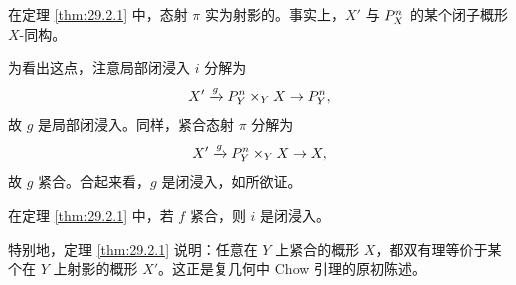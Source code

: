 \begin{remark}\label{rem:29.2.3}
在定理 \ref{thm:29.2.1} 中，态射 $\pi$ 实为射影的。事实上，$X'$ 与 $P^n_X$ 的某个闭子概形 $X$-同构。

为看出这点，注意局部闭浸入 $i$ 分解为
\[
X'\xrightarrow{g}P^n_Y\times_Y X\to P^n_Y,
\]
故 $g$ 是局部闭浸入。同样，紧合态射 $\pi$ 分解为
\[
X'\xrightarrow{g}P^n_Y\times_Y X\to X,
\]
故 $g$ 紧合。合起来看，$g$ 是闭浸入，如所欲证。
\end{remark}

\begin{exercise}\label{exc:29.2.4}
在定理 \ref{thm:29.2.1} 中，若 $f$ 紧合，则 $i$ 是闭浸入。
\end{exercise}

\begin{remark}\label{rem:29.2.5}
特别地，定理 \ref{thm:29.2.1} 说明：任意在 $Y$ 上紧合的概形 $X$，都双有理等价于某个在 $Y$ 上射影的概形 $X'$。这正是复几何中 Chow 引理的原初陈述。
\end{remark}

